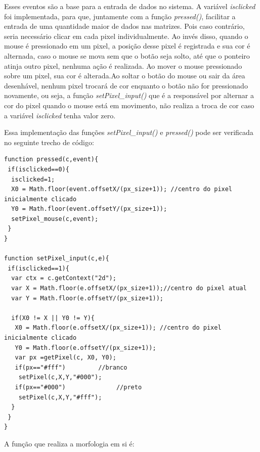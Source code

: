\documentclass[conference,harvard,brazil,english]{sbatex}
\begin{document}
Esses eventos são a base para a entrada de dados no sistema. A variável \textit{isclicked} foi implementada, para que, juntamente com a função \textit{pressed()}, facilitar a entrada de uma quantidade maior de dados nas matrizes. Pois caso contrário, seria necessário clicar em cada pixel individualmente. Ao invés disso, quando o mouse é pressionado em um pixel, a posição desse pixel é registrada e sua cor é alternada, caso o mouse se mova sem que o botão seja solto, até que o ponteiro atinja outro pixel, nenhuma ação é realizada. Ao mover o mouse pressionado sobre um pixel, sua cor é alterada.Ao soltar o botão do mouse ou sair da área desenhável, nenhum pixel trocará de cor enquanto o botão não for pressionado novamente, ou seja, a função \textit{setPixel\_input()} que é a responsável por alternar a cor do pixel quando o mouse está em movimento, não realiza a troca de cor caso a variável \textit{isclicked} tenha valor zero. 

Essa implementação das funções \textit{setPixel\_input()} e \textit{pressed()} pode ser verificada no seguinte trecho de código:




\begin{lstlisting}
function pressed(c,event){
 if(isclicked==0){
  isclicked=1; 
  X0 = Math.floor(event.offsetX/(px_size+1)); //centro do pixel inicialmente clicado
  Y0 = Math.floor(event.offsetY/(px_size+1)); 
  setPixel_mouse(c,event);
 }
}

function setPixel_input(c,e){
 if(isclicked==1){
  var ctx = c.getContext("2d");
  var X = Math.floor(e.offsetX/(px_size+1));//centro do pixel atual
  var Y = Math.floor(e.offsetY/(px_size+1));

  if(X0 != X || Y0 != Y){
   X0 = Math.floor(e.offsetX/(px_size+1)); //centro do pixel inicialmente clicado
   Y0 = Math.floor(e.offsetY/(px_size+1));
   var px =getPixel(c, X0, Y0);
   if(px=="#fff")         //branco
    setPixel(c,X,Y,"#000");
   if(px=="#000")              //preto
    setPixel(c,X,Y,"#fff");
  }
 }
}

\end{lstlisting}

A função que realiza a morfologia em si é:
\end{document}
